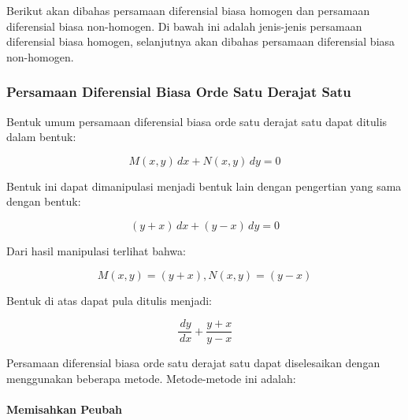 Berikut akan dibahas persamaan diferensial biasa homogen dan persamaan diferensial biasa non-homogen. Di bawah ini adalah jenis-jenis persamaan diferensial biasa homogen, selanjutnya akan dibahas persamaan diferensial biasa non-homogen.

\subsubsection{Persamaan Diferensial Biasa Orde Satu Derajat Satu}
\label{par:PDB1}

Bentuk umum persamaan diferensial biasa orde satu derajat satu dapat ditulis dalam bentuk:

\begin{equation} M(x,y) \, dx + N(x, y) \, dy = 0 \end{equation}

Bentuk ini dapat dimanipulasi menjadi bentuk lain dengan pengertian yang sama dengan bentuk:

\begin{displaymath} (y + x) \, dx + (y - x) \, dy = 0 \end{displaymath}

Dari hasil manipulasi terlihat bahwa:

\begin{displaymath} M(x, y) = (y + x),  N(x, y) = (y - x) \end{displaymath}

Bentuk di atas dapat pula ditulis menjadi:

\begin{displaymath} \dfrac{\, dy}{\, dx} + \dfrac{y + x}{y - x} \end{displaymath}

Persamaan diferensial biasa orde satu derajat satu dapat diselesaikan dengan menggunakan beberapa metode. Metode-metode ini adalah:

\paragraph{Memisahkan Peubah}
\label{par:MP}

